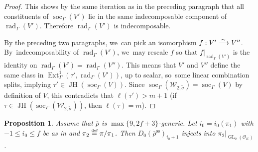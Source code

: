 \documentclass[JEP,XML,SOM,Unicode,NoFloatCountersInSection, NoEqCountersInSection,published]{cedram}
\let\wt\widetilde
\newcommand{\defeq}{\stackrel{\textrm{\tiny{\upshape{def}}}}{=}}
\newcommand{\cO}{\mathcal{O}}
\renewcommand{\ss}{\mathrm{ss}}
\newcommand{\brho}{\overline{\rho}}
\DeclareMathOperator{\Ext}{Ext}
\DeclareMathOperator{\GL}{GL}
\DeclareMathOperator{\JH}{\mathrm{JH}}
\DeclareMathOperator{\rad}{rad}
\DeclareMathOperator{\soc}{soc}
\theoremstyle{plain}
\newtheorem{prop}{Proposition}[subsection]
\theoremstyle{definition}
\begin{document}
\begin{proof}
This shows by the same iteration as in the preceding paragraph that all constituents of $\soc_\Gamma(V')$ lie in the same indecomposable component of $\rad_\Gamma(V')$.
Therefore $\rad_\Gamma(V')$ is indecomposable.

By the preceding two paragraphs, we~can pick an isomorphism $f: V' \xrightarrow{\,\sim\,} V''$. By~indecomposability of $\rad_\Gamma(V')$, we~may rescale $f$ so that $f|_{\rad_\Gamma(V')}$ is the identity on $\rad_\Gamma(V') = \rad_\Gamma(V'')$.
This means that $V'$ and $V''$ define the same class in $\Ext^1_\Gamma(\tau',\rad_\Gamma(V'))$, up to scalar, so~some linear combination splits, implying $\tau' \in \JH(\soc_\Gamma(V))$.
Since $\soc_\Gamma(\mathcal{W}_{2,\wt\sigma}) = \soc_\Gamma(V)$ by definition of $V$, this contradicts that $\ell(\tau') > m+1$ (if~$\tau \in \JH(\soc_\Gamma(\mathcal{W}_{2,\wt\sigma}))$, then $\ell(\tau) = m$).
\end{proof}

\begin{prop}\label{prop:pi2K1}
{Assume that $\brho$ is $\max\{9,2f+3\}$-generic.}
Let $i_0=i_0(\pi_1)$ with $-1\leq i_0\leq f$ be as in \cite[Th.\,4.3.15]{BHHMS4} and $\pi_2\defeq \pi/\pi_1$.
Then $D_0(\brho^\ss)_{i_0+1}$ injects into $\pi_2|_{\GL_2(\cO_K)}$.
\end{prop}
\end{document}
